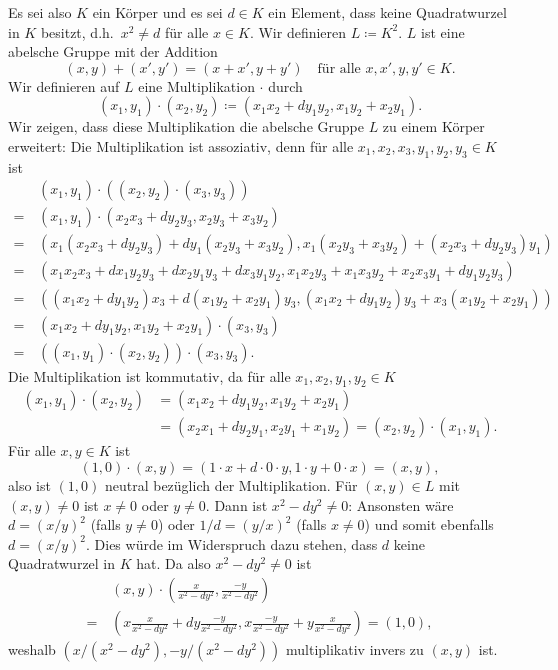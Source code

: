 Es sei also $K$ ein Körper und es sei $d \in K$ ein Element, dass keine Quadratwurzel in $K$ besitzt, d.h.\ $x^2 \neq d$ für alle $x \in K$. Wir definieren $L \coloneqq K^2$. $L$ ist eine abelsche Gruppe mit der Addition
\[
 (x,y) + (x', y') = (x+x', y+y')
 \quad
 \text{für alle $x,x',y,y' \in K$}.
\]
Wir definieren auf $L$ eine Multiplikation $\cdot$ durch
\[
 (x_1, y_1) \cdot (x_2, y_2) \coloneqq (x_1 x_2 + d y_1 y_2, x_1 y_2 + x_2 y_1).
\]
Wir zeigen, dass diese Multiplikation die abelsche Gruppe $L$ zu einem Körper erweitert: Die Multiplikation ist assoziativ, denn für alle $x_1, x_2, x_3, y_1, y_2, y_3 \in K$ ist
\begin{align*}
  &\, (x_1, y_1) \cdot ((x_2, y_2) \cdot (x_3, y_3)) \\
 =&\, (x_1, y_1) \cdot (x_2 x_3 + d y_2 y_3, x_2 y_3 + x_3 y_2) \\
 =&\, (x_1 (x_2 x_3 + d y_2 y_3) + d y_1 (x_2 y_3 + x_3 y_2), x_1 (x_2 y_3 + x_3 y_2) + (x_2 x_3 + d y_2 y_3) y_1) \\
 =&\, (x_1 x_2 x_3 + d x_1 y_2 y_3 + d x_2 y_1 y_3 + d x_3 y_1 y_2, x_1 x_2 y_3 + x_1 x_3 y_2 + x_2 x_3 y_1 + d y_1 y_2 y_3) \\
 =&\, ((x_1 x_2 + d y_1 y_2) x_3 + d (x_1 y_2 + x_2 y_1) y_3, (x_1 x_2 + d y_1 y_2) y_3 + x_3 (x_1 y_2 + x_2 y_1)) \\
 =&\, (x_1 x_2 + d y_1 y_2, x_1 y_2 + x_2 y_1) \cdot (x_3, y_3) \\
 =&\, ((x_1, y_1) \cdot (x_2, y_2)) \cdot (x_3, y_3).
\end{align*}
Die Multiplikation ist kommutativ, da für alle $x_1, x_2, y_1, y_2 \in K$
\begin{align*}
 (x_1, y_1) \cdot (x_2, y_2)
 &= (x_1 x_2 + d y_1 y_2, x_1 y_2 + x_2 y_1) \\
 &= (x_2 x_1 + d y_2 y_1, x_2 y_1 + x_1 y_2)
 = (x_2, y_2) \cdot (x_1, y_1).
\end{align*}
Für alle $x,y \in K$ ist
\[
 (1,0) \cdot (x,y)
 = (1 \cdot x + d \cdot 0 \cdot y, 1 \cdot y + 0 \cdot x)
 = (x,y),
\]
also ist $(1,0)$ neutral bezüglich der Multiplikation. Für $(x,y) \in L$ mit $(x,y) \neq 0$ ist $x \neq 0$ oder $y \neq 0$. Dann ist $x^2 - dy^2 \neq 0$: Ansonsten wäre $d = (x/y)^2$ (falls $y \neq 0$) oder $1/d = (y/x)^2$ (falls $x \neq 0$) und somit ebenfalls $d = (x/y)^2$. Dies würde im Widerspruch dazu stehen, dass $d$ keine Quadratwurzel in $K$ hat. Da also $x^2 - dy^2 \neq 0$ ist
\begin{align*}
  &\, (x,y) \cdot \left( \frac{x}{x^2-dy^2}, \frac{-y}{x^2-dy^2} \right) \\
 =&\, \left( x\frac{x}{x^2-dy^2} + dy\frac{-y}{x^2-dy^2}, x\frac{-y}{x^2-dy^2}+y\frac{x}{x^2-dy^2} \right)
 = (1,0),
\end{align*}
weshalb $(x/(x^2-dy^2), -y/(x^2-dy^2))$ multiplikativ invers zu $(x,y)$ ist.

